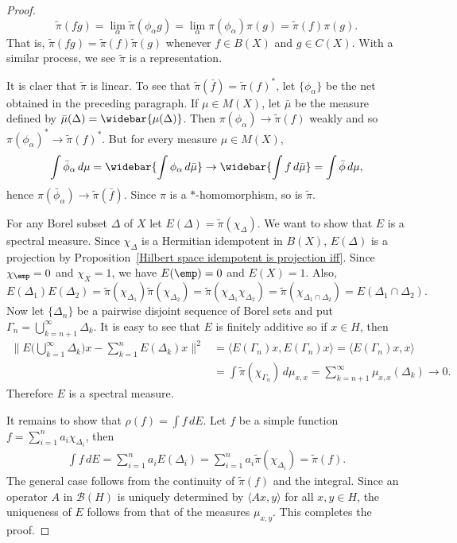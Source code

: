 \begin{proof}
\[\widetilde{\pi}(fg)=\lim_\alpha\widetilde{\pi}(\phi_\alpha g)=\lim_\alpha\pi(\phi_\alpha)\pi(g)=\widetilde{\pi}(f)\pi(g).\]
That is, $\widetilde{\pi}(fg)=\widetilde{\pi}(f)\widetilde{\pi}(g)$ whenever $f\in B(X)$ and $g\in C(X)$. With a similar process, we see $\widetilde{\pi}$ is a representation.\par
It is claer that $\widetilde{\pi}$ is linear. To see that $\widetilde{\pi}(\bar{f})=\widetilde{\pi}(f)^*$, let $\{\phi_\alpha\}$ be the net obtained in the preceding paragraph. If $\mu\in M(X)$, let $\bar{\mu}$ be the measure defined by $\bar{\mu}(\Delta)=\widebar{\mu(\Delta)}$. Then $\pi(\phi_\alpha)\to\widetilde{\pi}(f)$ weakly and so $\pi(\phi_\alpha)^*\to\widetilde{\pi}(f)^*$. But for every measure $\mu\in M(X)$,
\[\int\bar{\phi}_\alpha\,d\mu=\widebar{\int\phi_\alpha\,d\bar{\mu}}\to\widebar{\int f\,d\bar{\mu}}=\int\bar{\phi}\,d\mu,\]
hence $\pi(\bar{\phi}_\alpha)\to\widetilde{\pi}(\bar{f})$. Since $\pi$ is a $*$-homomorphism, so is $\widetilde{\pi}$.\par
For any Borel subset $\Delta$ of $X$ let $E(\Delta)=\widetilde{\pi}(\chi_\Delta)$. We want to show that $E$ is a spectral measure. Since $\chi_\Delta$ is a Hermitian idempotent in $B(X)$, $E(\Delta)$ is a projection by Proposition~\ref{Hilbert space idempotent is projection iff}. Since $\chi_\emp=0$ and $\chi_X=1$, we have $E(\emp)=0$ and $E(X)=1$. Also,
\[E(\Delta_1)E(\Delta_2)=\widetilde{\pi}(\chi_{\Delta_1})\widetilde{\pi}(\chi_{\Delta_2})=\widetilde{\pi}(\chi_{\Delta_1}\chi_{\Delta_2})=\widetilde{\pi}(\chi_{\Delta_1\cap\Delta_2})=E(\Delta_1\cap\Delta_2).\]
Now let $\{\Delta_n\}$ be a pairwise disjoint sequence of Borel sets and put $\Gamma_n=\bigcup_{k=n+1}^{\infty}\Delta_k$. It is easy to see that $E$ is finitely additive so if $x\in H$, then
\begin{align*}
\Big\|E\Big(\bigcup_{k=1}^{\infty}\Delta_k\Big)x-\sum_{k=1}^{n}E(\Delta_k)x\Big\|^2&=\langle E(\Gamma_n)x,E(\Gamma_n)x\rangle=\langle E(\Gamma_n)x,x\rangle\\
&=\int\widetilde{\pi}(\chi_{\Gamma_n})\,d\mu_{x,x}=\sum_{k=n+1}^{\infty}\mu_{x,x}(\Delta_k)\to 0.
\end{align*}
Therefore $E$ is a spectral measure.\par
It remains to show that $\rho(f)=\int f\,dE$. Let $f$ be a simple function $f=\sum_{i=1}^{n}a_i\chi_{\Delta_i}$, then
\begin{align*}
\int f\,dE=\sum_{i=1}^{n}a_iE(\Delta_i)=\sum_{i=1}^{n}a_i\widetilde{\pi}(\chi_{\Delta_i})=\widetilde{\pi}(f).
\end{align*}
The general case follows from the continuity of $\widetilde{\pi}(f)$ and the integral. Since an operator $A$ in $\mathcal{B}(H)$ is uniquely determined by $\langle Ax,y\rangle$ for all $x,y\in H$, the uniqueness of $E$ follows from that of the measures $\mu_{x,y}$. This completes the proof.
\end{proof}
